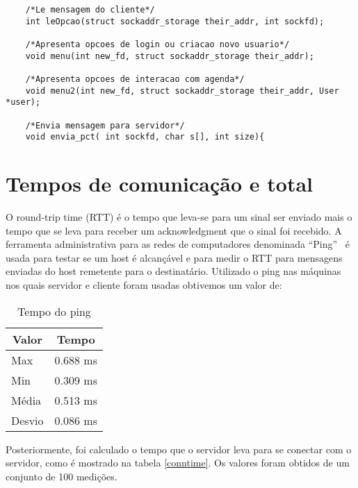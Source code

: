 \documentclass[10pt,a4paper]{article}
\begin{document}
\begin{itemize}
\begin{lstlisting}
    /*Le mensagem do cliente*/
    int leOpcao(struct sockaddr_storage their_addr, int sockfd);
    
    /*Apresenta opcoes de login ou criacao novo usuario*/
    void menu(int new_fd, struct sockaddr_storage their_addr);
    
    /*Apresenta opcoes de interacao com agenda*/
    void menu2(int new_fd, struct sockaddr_storage their_addr, User *user);

    /*Envia mensagem para servidor*/
    void envia_pct( int sockfd, char s[], int size){

    \end{lstlisting}


  \end{itemize}




  \section{Tempos de comunicação e total}
  O round-trip time (RTT) é o tempo que leva-se para um sinal ser
  enviado mais o tempo que se leva para receber um acknowledgment que o
  sinal foi recebido. A ferramenta administrativa para as redes de
  computadores denominada ``Ping''~\cite{Ping} é usada para testar se um host é alcançável e para
  medir o RTT para mensagens enviadas do host remetente para o
  destinatário.
  Utilizado o ping nas máquinas nos quais servidor e cliente foram
  usadas obtivemos um valor de: 

  \begin{table}[h!]
    \begin{center}
        \begin{tabular}{lr}
          \multicolumn{1}{c}{Valor} & \multicolumn{1}{c}{Tempo}\\
          \hline
          Max & 0.688 ms\\
          Min & 0.309 ms\\
          Média & 0.513 ms \\
          Desvio & 0.086 ms
        \end{tabular}
        \label{pingtime}
    \end{center}
    \vspace{-5mm}
    \caption{Tempo do ping}
  \end{table}

  Posteriormente,  foi calculado o tempo que o servidor leva para se
  conectar com o servidor, como é mostrado na tabela \ref{conntime}. Os valores foram obtidos de um
  conjunto de 100 medições.
\end{document}
